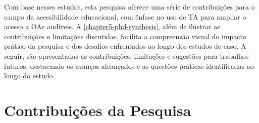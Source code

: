 Com base nesses estudos, esta pesquisa oferece uma série de contribuições para o campo da acessibilidade educacional, com ênfase no uso de TA para ampliar o acesso a OAs audíveis. A \autoref{chapter5-phd-synthesis}, além de ilustrar as contribuições e limitações discutidas, facilita a compreensão visual do impacto prático da pesquisa e dos desafios enfrentados ao longo dos estudos de caso. A seguir, são apresentadas as contribuições, limitações e sugestões para trabalhos futuros, destacando os avanços alcançados e as questões práticas identificadas ao longo do estudo.

\section{Contribuições da Pesquisa}




